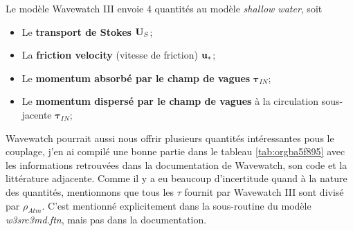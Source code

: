 \documentclass[10pt]{report}
\numberwithin{equation}{section}
\newcommand{\uu}{\vb{u}}
\begin{document}
Le modèle Wavewatch III envoie 4 quantités au modèle \emph{shallow water}, soit
\begin{itemize}
\item Le \textbf{transport de Stokes} \(\vb{U}_S\);
\item La \textbf{friction velocity} (vitesse de friction) \(\vb{\uu}_*\);
\item Le \textbf{momentum absorbé par le champ de vagues} \(\boldsymbol{\tau}_{IN}\);
\item Le \textbf{momentum dispersé par le champ de vagues} à la circulation sous-jacente \(\boldsymbol{\tau}_{IN}\);\bigskip
\end{itemize}

Wavewatch pourrait aussi nous offrir plusieurs quantités intéressantes pous le couplage, j'en ai compilé une bonne partie dans le tableau \ref{tab:orgba5f895} avec les informations retrouvées dans la documentation de Wavewatch, son code et la littérature adjacente.
Comme il y a eu beaucoup d'incertitude quand à la nature des quantités, mentionnons que tous les \(\tau\) fournit par Wavewatch III sont divisé par \(\rho_{Atm}\).
C'est mentionné explicitement dans la sous-routine du modèle \emph{w3src3md.ftn}, mais pas dans la documentation.
\end{document}
